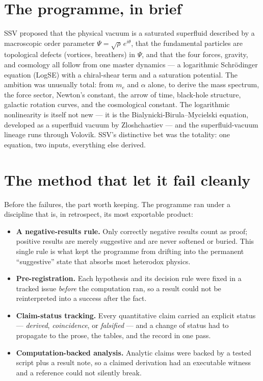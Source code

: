 \documentclass[11pt]{article}
\begin{document}
\section{The programme, in brief}

SSV proposed that the physical vacuum is a saturated superfluid described by a
macroscopic order parameter $\Psi=\sqrt{\rho}\,e^{i\theta}$, that the fundamental
particles are topological defects (vortices, breathers) in $\Psi$, and that the
four forces, gravity, and cosmology all follow from one master dynamics --- a
logarithmic Schr\"odinger equation (LogSE) with a chiral-shear term and a
saturation potential. The ambition was unusually total: from $m_e$ and $\alpha$
alone, to derive the mass spectrum, the force sector, Newton's constant, the
arrow of time, black-hole structure, galactic rotation curves, and the
cosmological constant. The logarithmic nonlinearity is itself not new --- it is
the Bialynicki-Birula--Mycielski equation, developed as a superfluid vacuum by
Zloshchastiev --- and the superfluid-vacuum lineage runs through Volovik. SSV's
distinctive bet was the totality: one equation, two inputs, everything else
derived.

\section{The method that let it fail cleanly}

Before the failures, the part worth keeping. The programme ran under a discipline
that is, in retrospect, its most exportable product:

\begin{itemize}[leftmargin=1.4em]
\item \textbf{A negative-results rule.} Only correctly negative results count as
  proof; positive results are merely suggestive and are never softened or buried.
  This single rule is what kept the programme from drifting into the permanent
  ``suggestive'' state that absorbs most heterodox physics.
\item \textbf{Pre-registration.} Each hypothesis and its decision rule were fixed
  in a tracked issue \emph{before} the computation ran, so a result could not be
  reinterpreted into a success after the fact.
\item \textbf{Claim-status tracking.} Every quantitative claim carried an explicit
  status --- \emph{derived}, \emph{coincidence}, or \emph{falsified} --- and a
  change of status had to propagate to the prose, the tables, and the record in
  one pass.
\item \textbf{Computation-backed analysis.} Analytic claims were backed by a
  tested script plus a result note, so a claimed derivation had an executable
  witness and a reference could not silently break.
\end{itemize}
\end{document}
